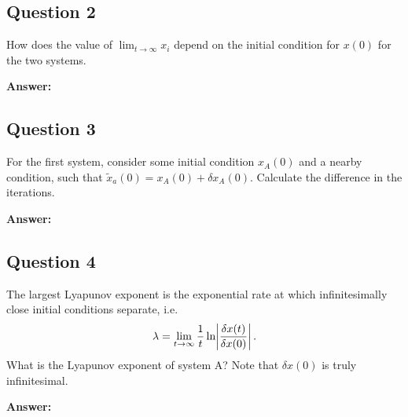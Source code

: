 \documentclass[a4paper]{article}
\newcommand{\newparagraph}{\vspace{.5cm}\noindent}
\begin{document}
\subsection*{Question 2}
How does the value of $\lim_{t\to\infty}x_i$ depend on the initial condition for $x(0)$ for the two systems.

\newparagraph
\textbf{Answer: }

\subsection*{Question 3}
For the first system, consider some initial condition $x_A(0)$ and a nearby condition, such that $\tilde{x}_a(0) = x_A(0) + \delta x_A(0)$.
Calculate the difference in the iterations.

\newparagraph
\textbf{Answer: }

\subsection*{Question 4}
The largest Lyapunov exponent is the exponential rate at which infinitesimally close initial conditions separate, i.e.
\begin{align*}
    \lambda = \lim_{t\to\infty}\frac{1}{t}\ln\abs{\frac{\delta x(t)}{\delta x(0)}}.
\end{align*}What is the Lyapunov exponent of system A? Note that $\delta x(0)$ is truly infinitesimal.

\newparagraph
\textbf{Answer: }
\end{document}
